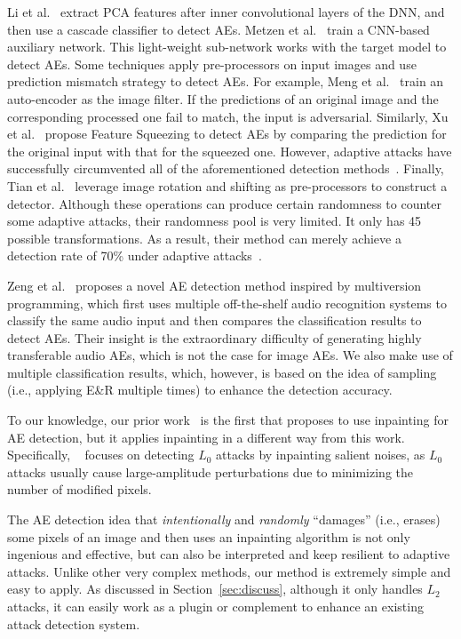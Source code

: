 \documentclass[sigconf]{acmart}
\begin{document}
Li et al.~\cite{li2017adversarial} extract PCA features 
after inner convolutional layers of the DNN, and then use
a cascade classifier to detect AEs. Metzen et al.~\cite{metzen2017detecting} train a CNN-based auxiliary network. This light-weight sub-network works with the target model to detect AEs. 
Some techniques apply pre-processors on input images and use prediction mismatch strategy to detect AEs. For example, Meng et al.~\cite{meng2017magnet} train an auto-encoder as the image filter. If the predictions of an original image and the corresponding processed one fail to match, the input is adversarial. Similarly, Xu et al.~\cite{xu2017feature} propose Feature Squeezing to detect AEs by comparing the prediction for the original input with that for the squeezed one. However, adaptive attacks have successfully circumvented all of the aforementioned detection methods~\cite{carlini2017adversarial,carlini2017magnet,he2017adversarial}.
Finally, Tian et al.~\cite{tian2018detecting} leverage image rotation and shifting as pre-processors to construct a detector. Although these operations can produce certain randomness to counter
some adaptive attacks, their randomness pool is very limited. It only has
45 possible transformations.
As a result, their method can merely achieve a detection rate of 70\% under adaptive attacks~\cite{tian2018detecting}. 

Zeng et al.~\cite{zeng2019multiversion} proposes a novel AE detection
method inspired by multiversion programming, which first uses multiple off-the-shelf audio 
recognition systems to classify the same audio input and then compares the classification
results to detect AEs. Their insight is the extraordinary difficulty of generating highly transferable audio AEs, which is not the case for image AEs. We also make use of multiple classification results, which,
however, is based on the idea of sampling (i.e., applying E\&R multiple times) to enhance the detection accuracy.

To our knowledge, our prior work~\cite{zuo2019l0} is the first that proposes to
use inpainting for AE detection, but it applies inpainting 
in a different way from this work. Specifically, ~\cite{zuo2019l0} focuses on detecting $L_0$ attacks by inpainting salient noises, as $L_0$ attacks
usually cause large-amplitude perturbations due to minimizing the number of modified pixels.

The AE detection idea that \emph{intentionally} and \emph{randomly} ``damages'' (i.e., erases) some pixels of an image and
then uses an inpainting algorithm  is not only ingenious and effective, but can also be interpreted and keep resilient to adaptive attacks. Unlike other very complex methods, our method
is extremely simple and easy to apply. As discussed in Section~\ref{sec:discuss}, although it only handles
$L_2$ attacks, it can easily work as a plugin or complement to enhance an existing attack detection system.
\end{document}
